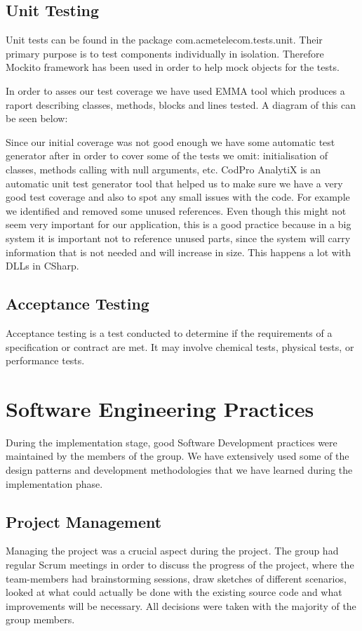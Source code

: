 \documentclass[11pt,twocolumn]{article} %
\begin{document}
\subsection{Unit Testing}
Unit tests can be found in the package com.acmetelecom.tests.unit. Their primary purpose is to test components individually in isolation. Therefore Mockito\cite{mockito} framework has been used in order to help mock objects for the tests.

In order to asses our test coverage we have used EMMA tool which produces a raport describing classes, methods, blocks and lines tested. A diagram of this can be seen below:

Since our initial coverage was not good enough we have some automatic test generator after in order to cover some of the tests we omit: initialisation of classes, methods calling with null arguments, etc. 
CodPro AnalytiX\cite{codePro}  is an automatic unit test generator tool that helped us to make sure we have a very good test coverage and also to spot any small issues with the code. 
For example we identified and removed some unused references. Even though this might not seem very important for our application, this is a good practice because in a 
big system it is important not to reference unused parts, since the system will carry information that is not needed and will increase in size. This happens a lot with DLLs in CSharp. 

\subsection{Acceptance Testing}
Acceptance testing is a test conducted to determine if the requirements of a specification or contract are met. 
It may involve chemical tests, physical tests, or performance tests.

\section{Software Engineering Practices}
During the implementation stage, good Software Development practices were maintained by the members of the group. We have extensively used some of the design patterns and development methodologies that we have learned during the implementation phase.

\subsection{Project Management}
Managing the project was a crucial aspect during the project. The group had regular Scrum meetings in order to discuss the 
progress of the project, where the team-members had brainstorming sessions, draw sketches of different scenarios, looked at
what could actually be done with the existing source code and what improvements will be necessary. All decisions were taken
with the majority of the group members.
\end{document}
